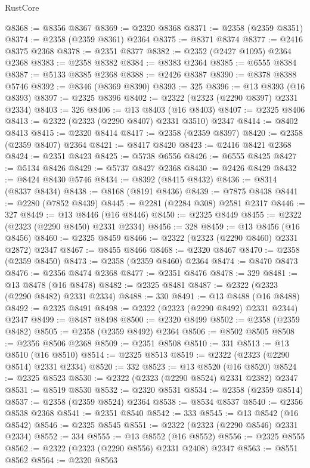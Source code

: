 \begin{lexlean}{RustCore}
\begin{coremodule}
@8368 := @8356 @8367
@8369 := @2320 @8368
@8371 := @2358 (@2359 @8351)
@8374 := @2358 (@2359 @8361) @2364
@8375 := @8371 @8374
@8377 := @2416 @8375 @2368
@8378 := @2351 @8377
@8382 := @2352 (@2427 @1095) @2364 @2368
@8383 := @2358 @8382
@8384 := @8383 @2364
@8385 := @6555 @8384
@8387 := @5133 @8385 @2368
@8388 := @2426 @8387
@8390 := @8378 @8388 @5746
@8392 := @8346 (@8369 @8390)
@8393 := 325
@8396 := @13 @8393 (@16 @8393)
@8397 := @2325 @8396
@8402 := @2322 (@2323 (@2290 @8397) @2331 @2334)
@8403 := 326
@8406 := @13 @8403 (@16 @8403)
@8407 := @2325 @8406
@8413 := @2322 (@2323 (@2290 @8407) @2331 @3510) @2347
@8414 := @8402 @8413
@8415 := @2320 @8414
@8417 := @2358 (@2359 @8397)
@8420 := @2358 (@2359 @8407) @2364
@8421 := @8417 @8420
@8423 := @2416 @8421 @2368
@8424 := @2351 @8423
@8425 := @5738 @6556
@8426 := @6555 @8425
@8427 := @5134 @8426
@8429 := @5737 @8427 @2368
@8430 := @2426 @8429
@8432 := @8424 @8430 @5746
@8434 := @8392 (@8415 @8432)
@8436 := @8314 (@8337 @8434)
@8438 := @8168 (@8191 @8436)
@8439 := @7875 @8438
@8441 := @2280 (@7852 @8439)
@8445 := @2281 (@2284 @308) @2581 @2317
@8446 := 327
@8449 := @13 @8446 (@16 @8446)
@8450 := @2325 @8449
@8455 := @2322 (@2323 (@2290 @8450) @2331 @2334)
@8456 := 328
@8459 := @13 @8456 (@16 @8456)
@8460 := @2325 @8459
@8466 := @2322 (@2323 (@2290 @8460) @2331 @2872) @2347
@8467 := @8455 @8466
@8468 := @2320 @8467
@8470 := @2358 (@2359 @8450)
@8473 := @2358 (@2359 @8460) @2364
@8474 := @8470 @8473
@8476 := @2356 @8474 @2368
@8477 := @2351 @8476
@8478 := 329
@8481 := @13 @8478 (@16 @8478)
@8482 := @2325 @8481
@8487 := @2322 (@2323 (@2290 @8482) @2331 @2334)
@8488 := 330
@8491 := @13 @8488 (@16 @8488)
@8492 := @2325 @8491
@8498 := @2322 (@2323 (@2290 @8492) @2331 @2344) @2347
@8499 := @8487 @8498
@8500 := @2320 @8499
@8502 := @2358 (@2359 @8482)
@8505 := @2358 (@2359 @8492) @2364
@8506 := @8502 @8505
@8508 := @2356 @8506 @2368
@8509 := @2351 @8508
@8510 := 331
@8513 := @13 @8510 (@16 @8510)
@8514 := @2325 @8513
@8519 := @2322 (@2323 (@2290 @8514) @2331 @2334)
@8520 := 332
@8523 := @13 @8520 (@16 @8520)
@8524 := @2325 @8523
@8530 := @2322 (@2323 (@2290 @8524) @2331 @2382) @2347
@8531 := @8519 @8530
@8532 := @2320 @8531
@8534 := @2358 (@2359 @8514)
@8537 := @2358 (@2359 @8524) @2364
@8538 := @8534 @8537
@8540 := @2356 @8538 @2368
@8541 := @2351 @8540
@8542 := 333
@8545 := @13 @8542 (@16 @8542)
@8546 := @2325 @8545
@8551 := @2322 (@2323 (@2290 @8546) @2331 @2334)
@8552 := 334
@8555 := @13 @8552 (@16 @8552)
@8556 := @2325 @8555
@8562 := @2322 (@2323 (@2290 @8556) @2331 @2408) @2347
@8563 := @8551 @8562
@8564 := @2320 @8563

\end{coremodule}
\end{lexlean}
